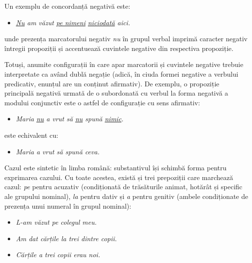 \documentclass[]{../../metanetpaper}
\begin{document}
\begin{multicols}{2}
Un exemplu de concordanță negativă este:

\begin{itemize}
\item\textit{\underline{Nu} am văzut \underline{pe nimeni} \underline{niciodată} aici.}
\end{itemize}

unde prezența marcatorului negativ \textit{nu} în grupul verbal imprimă caracter negativ întregii propoziții și accentuează cuvintele negative din respectiva propoziție. 

Totuși, anumite configurații în care apar marcatorii și cuvintele negative trebuie interpretate ca având dublă negație (adică, în ciuda formei negative a verbului predicativ, enunțul are un conținut afirmativ). De exemplu, o propoziție principală negativă urmată de o subordonată cu verbul la forma negativă a modului conjunctiv este o astfel de configurație cu sens afirmativ:

\begin{itemize}
\item\textit{Maria \underline{nu} a vrut să \underline{nu} spună \underline{nimic}.}
\end{itemize}

este echivalent cu:

\begin{itemize}
\item\textit{Maria a vrut să spună ceva.}
\end{itemize}

Cazul este sintetic în limba română: substantivul își schimbă forma pentru exprimarea cazului. Cu toate acestea, există și trei prepoziții care marchează cazul: \textit{pe} pentru acuzativ (condiționată de trăsăturile animat, hotărât și specific ale grupului nominal), \textit{la} pentru dativ și \textit{a} pentru genitiv (ambele condiționate de prezența unui numeral în grupul nominal):

\begin{itemize}
\item \textit{L-am văzut \textit{pe} colegul meu.}
\item \textit{Am dat cărțile \textit{la} trei dintre copii.}
\item \textit{Cărțile \textit{a} trei copii erau noi.}
\end{itemize}



\end{multicols}
\end{document}
